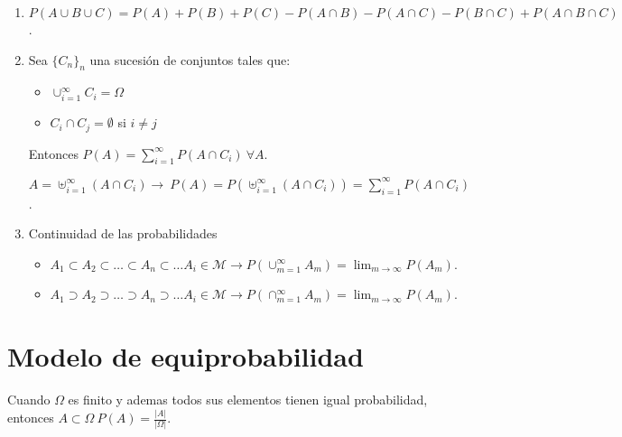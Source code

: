 \documentclass{report}
\begin{document}
{\begin{enumerate}
		\item $P(A\cup B\cup C)=P(A)+P(B)+P(C)-P(A\cap B)-P(A\cap C)-P(B\cap C)+P(A\cap B\cap C)$.
		\item Sea $\{C_n\}_n$ una sucesión de conjuntos tales que:
		      \begin{itemize}
			      \item $\cup_{i=1}^\infty C_i=\Omega$
			      \item $C_i\cap C_j=\emptyset$ si $i\neq j$
		      \end{itemize}
		      Entonces $P(A)=\sum_{i=1}^{\infty} P(A\cap C_i)\ \forall A$.
		      \begin{myproof}$A=\uplus_{i=1}^\infty(A\cap C_i)\to\ P(A)=P(\uplus_{i=1}^\infty(A\cap C_i))=\sum_{i=1}^{\infty} P(A\cap C_i)$.\end{myproof}
		\item Continuidad de las probabilidades
		      \begin{itemize}
			      \item $A_1\subset A_2\subset\dots\subset A_n\subset\dots A_i\in\mathcal{M}\to P(\cup_{m=1}^\infty A_m)=\lim_{m \to \infty} P(A_m)$.
			      \item $A_1\supset A_2\supset\dots\supset A_n\supset\dots A_i\in\mathcal{M}\to P(\cap_{m=1}^\infty A_m)=\lim_{m \to \infty}P(A_m)$.
		      \end{itemize}
	\end{enumerate}}
\section{Modelo de equiprobabilidad}
Cuando $\Omega$ es finito y ademas todos sus elementos tienen igual probabilidad, entonces $A\subset\Omega\ P(A)=\frac{|A|}{|\Omega|}$.
\end{document}
